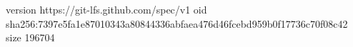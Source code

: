 version https://git-lfs.github.com/spec/v1
oid sha256:7397e5fa1e87010343a80844336abfaea476d46fcebd959b0f17736c70f08c42
size 196704
